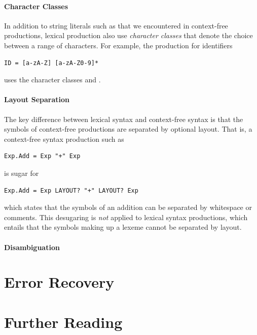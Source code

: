 \paragraph{Character Classes}

In addition to string literals such as  that we encountered in
context-free productions, lexical production also use \emph{character classes}
that denote the choice between a range of characters. For example, the
production for identifiers

\begin{lstlisting}[language=SDF]
ID = [a-zA-Z] [a-zA-Z0-9]* 
\end{lstlisting}

uses the character classes \sdfcode{[a-zA-Z]} and \sdfcode{[a-zA-Z0-9]}.

\paragraph{Layout Separation}

The key difference between lexical syntax and context-free syntax is that the
symbols of context-free productions are separated by optional layout. That is, a
context-free syntax production such as

\begin{lstlisting}[language=SDF]
Exp.Add = Exp "+" Exp 
\end{lstlisting}

is sugar for

\begin{lstlisting}[language=SDF]
Exp.Add = Exp LAYOUT? "+" LAYOUT? Exp 
\end{lstlisting}

which states that the symbols of an addition can be separated by whitespace or
comments. This desugaring is \emph{not} applied to lexical syntax productions,
which entails that the symbols making up a lexeme cannot be separated by layout.

\paragraph{Disambiguation}

\section{Error Recovery}

\cite{JongeKVS12}


\section{Further Reading}

